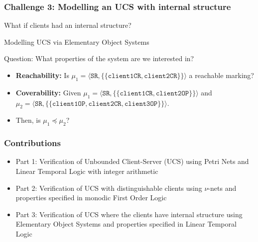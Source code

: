 \documentclass [serif,professionalfont]{beamer}
\newcommand{\tup}[1]{\langle#1\rangle}
\newcommand{\fmset}[1]{\{\!\{#1\}\!\}}
\begin{document}
\begin{frame}\frametitle{Challenge 3: Modelling an UCS with \colorbox{green!30}{internal structure}}
    \huge{What if clients had an internal structure?}
\end{frame}


\begin{frame}
\end{frame}
\begin{frame}
\end{frame}


\begin{frame}{Modelling UCS via Elementary Object Systems}
\end{frame}



\begin{frame}
    \begin{block}{Question: What properties of the system are we interested in?}
        \begin{itemize}
            \item \textbf{Reachability:} Is $\mu_1={\tup{\mathtt{SR},\fmset{\mathtt{client1CR},\mathtt{client2CR}}}}$ a reachable marking?
            \item \textbf{Coverability:} Given $\mu_1={\tup{\mathtt{SR},\fmset{\mathtt{client1CR},\mathtt{client2OP}}}}$ and $\mu_2={\tup{\mathtt{SR },\fmset{\mathtt{client1OP},\mathtt{client2CR},\mathtt{client3OP}}}}$.
            \item[] Then, is $\mu_1 \preceq \mu_2$?
        \end{itemize}
    \end{block}

\end{frame}






\begin{frame}
    \frametitle{Contributions}
    \begin{itemize}
        \item Part 1: Verification of Unbounded Client-Server (UCS) using Petri Nets and Linear Temporal Logic with integer arithmetic
        \item Part 2: Verification of UCS with distinguishable clients using $\nu$-nets and properties specified in monodic First Order Logic
        \item Part 3: Verification of UCS where the clients have internal structure using Elementary Object Systems and properties specified in Linear Temporal Logic
    \end{itemize}

\end{frame}
\end{document}
